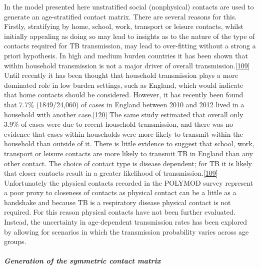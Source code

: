 \documentclass[11pt,twoside]{bristolthesis}
\begin{document}
  In the model presented here unstratified social (nonphysical) contacts are used to generate an age-stratified contact matrix. There are several reasons for this. Firstly, stratifying by home, school, work, transport or leisure contacts, whilst initially appealing as doing so may lead to insights as to the nature of the type of contacts required for TB transmission, may lead to over-fitting without a strong a priori hypothesis. In high and medium burden countries it has been shown that within household transmission is not a major driver of overall transmission.{[}\protect\hyperlink{ref-Mathema2018}{109}{]} Until recently it has been thought that household transmission plays a more dominated role in low burden settings, such as England, which would indicate that home contacts should be considered. However, it has recently been found that 7.7\% (1849/24,060) of cases in England between 2010 and 2012 lived in a household with another case.{[}\protect\hyperlink{ref-Lalor2017}{120}{]} The same study estimated that overall only 3.9\% of cases were due to recent household transmission, and there was no evidence that cases within households were more likely to transmit within the household than outside of it. There is little evidence to suggest that school, work, transport or leisure contacts are more likely to transmit TB in England than any other contact. The choice of contact type is disease dependent; for TB it is likely that closer contacts result in a greater likelihood of transmission.{[}\protect\hyperlink{ref-Mathema2018}{109}{]} Unfortunately the physical contacts recorded in the POLYMOD survey represent a poor proxy to closeness of contacts as physical contact can be a little as a handshake and because TB is a respiratory disease physical contact is not required. For this reason physical contacts have not been further evaluated. Instead, the uncertainty in age-dependent transmission rates has been explored by allowing for scenarios in which the transmission probability varies across age groups.
  
  \hypertarget{generation-of-the-symmetric-contact-matrix}{%
  \subparagraph{Generation of the symmetric contact matrix}\label{generation-of-the-symmetric-contact-matrix}}
  
\end{document}
